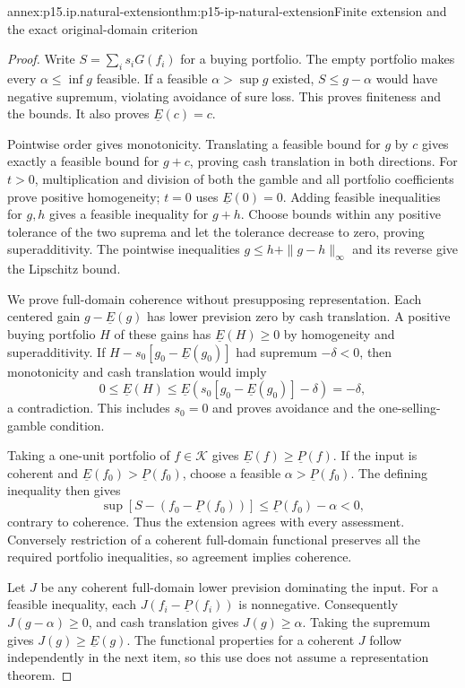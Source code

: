 \begin{annexitem}{annex:p15.ip.natural-extension}{thm:p15-ip-natural-extension}{Finite extension and the exact original-domain criterion}
\begin{proof}
Write \(S=\sum_i s_iG(f_i)\) for a buying portfolio. The empty
portfolio makes every \(\alpha\leq\inf g\) feasible. If a feasible
\(\alpha>\sup g\) existed, \(S\leq g-\alpha\) would have negative
supremum, violating avoidance of sure loss. This proves finiteness
and the bounds. It also proves \(\underline E(c)=c\).

Pointwise order gives monotonicity. Translating a feasible bound for
\(g\) by \(c\) gives exactly a feasible bound for \(g+c\), proving
cash translation in both directions. For \(t>0\), multiplication and
division of both the gamble and all portfolio coefficients prove
positive homogeneity; \(t=0\) uses \(\underline E(0)=0\).
Adding feasible inequalities for \(g,h\) gives a feasible inequality
for \(g+h\). Choose bounds within any positive tolerance of the two
suprema and let the tolerance decrease to zero, proving superadditivity.
The pointwise inequalities
\(g\leq h+\|g-h\|_\infty\) and its reverse give the Lipschitz bound.

We prove full-domain coherence without presupposing representation.
Each centered gain \(g-\underline E(g)\) has lower prevision zero
by cash translation. A positive buying portfolio \(H\) of these
gains has \(\underline E(H)\geq0\) by homogeneity and superadditivity.
If \(H-s_0[g_0-\underline E(g_0)]\) had supremum \(-\delta<0\),
then monotonicity and cash translation would imply
\[
 0\leq\underline E(H)
 \leq\underline E(s_0[g_0-\underline E(g_0)]-\delta)
 =-\delta,
\]
a contradiction. This includes \(s_0=0\) and proves avoidance and
the one-selling-gamble condition.

Taking a one-unit portfolio of \(f\in\mathcal K\) gives
\(\underline E(f)\geq\underline P(f)\). If the input is coherent
and \(\underline E(f_0)>\underline P(f_0)\), choose a feasible
\(\alpha>\underline P(f_0)\). The defining inequality then gives
\[
 \sup[S-(f_0-\underline P(f_0))]
                 \leq\underline P(f_0)-\alpha<0,
\]
contrary to coherence. Thus the extension agrees with every assessment.
Conversely restriction of a coherent full-domain functional preserves
all the required portfolio inequalities, so agreement implies coherence.

Let \(J\) be any coherent full-domain lower prevision dominating the
input. For a feasible inequality, each \(J(f_i-\underline P(f_i))\)
is nonnegative. Consequently \(J(g-\alpha)\geq0\), and cash
translation gives \(J(g)\geq\alpha\). Taking the supremum gives
\(J(g)\geq\underline E(g)\). The functional properties for a
coherent \(J\) follow independently in the next item, so this use
does not assume a representation theorem.


\end{proof}
\end{annexitem}

